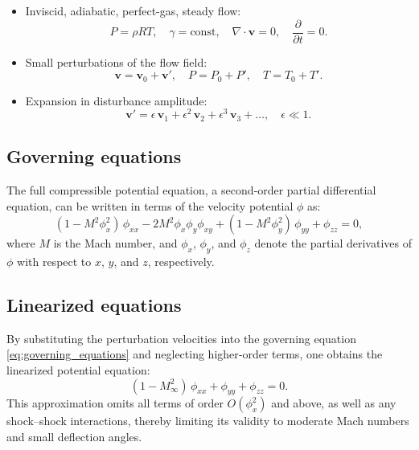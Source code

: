 \begin{itemize}
\item Inviscid, adiabatic, perfect-gas, steady flow:
    \begin{equation*}
        P = \rho R T, \quad \gamma = \mathrm{const}, \quad \nabla \cdot \boldsymbol{v} = 0, \quad \frac{\partial}{\partial t} = 0.
    \end{equation*}

\item Small perturbations of the flow field:
    \begin{equation*}
        \boldsymbol{v} = \boldsymbol{v}_0 + \boldsymbol{v}', \quad
        P = P_0 + P', \quad
        T = T_0 + T'.
    \end{equation*}

\item Expansion in disturbance amplitude:
    \begin{equation*}
        \boldsymbol{v}' = \epsilon\,\boldsymbol{v}_1 + \epsilon^2\,\boldsymbol{v}_2 + \epsilon^3\,\boldsymbol{v}_3 + \dots,
        \quad \epsilon \ll 1.
    \end{equation*}
\end{itemize}

\subsection{Governing equations}
\label{subsec:governing_equations}

The full compressible potential equation, a second‐order partial differential equation, can be written in terms of the velocity potential \(\phi\) as:
\begin{equation}
    (1 - M^2 \phi_x^2)\,\phi_{xx}
    - 2 M^2 \phi_x \phi_y \phi_{xy}
    + (1 - M^2 \phi_y^2)\,\phi_{yy}
    + \phi_{zz}
    = 0,
    \label{eq:governing_equations}
\end{equation}
where \(M\) is the Mach number, and \(\phi_x\), \(\phi_y\), and \(\phi_z\) denote the partial derivatives of \(\phi\) with respect to \(x\), \(y\), and \(z\), respectively.

\subsection{Linearized equations}
\label{subsec:linearized_equations}

By substituting the perturbation velocities into the governing equation \eqref{eq:governing_equations} and neglecting higher‐order terms, one obtains the linearized potential equation:
\begin{equation}
    (1 - M_\infty^2)\,\phi_{xx}
    + \phi_{yy}
    + \phi_{zz} = 0.
    \label{eq:small-disturb}
\end{equation}
This approximation omits all terms of order \(O(\phi_x^2)\) and above, as well as any shock–shock interactions, thereby limiting its validity to moderate Mach numbers and small deflection angles.

